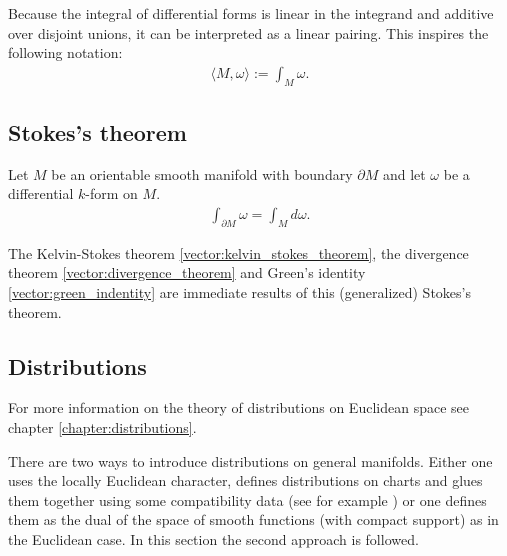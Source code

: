 
    \begin{notation}
        Because the integral of differential forms is linear in the integrand and additive over disjoint unions, it can be interpreted as a linear pairing. This inspires the following notation:
        \begin{gather}
            \langle M,\omega \rangle := \int_M\omega.
        \end{gather}
    \end{notation}

\subsection{Stokes's theorem}

    \begin{theorem}\label{diff:stokes_theorem}
        Let $M$ be an orientable smooth manifold with boundary $\partial M$ and let $\omega$ be a differential $k$-form on $M$.
        \begin{gather}
            \int_{\partial M}\omega = \int_M d\omega.
        \end{gather}
    \end{theorem}
    \begin{result}
        The Kelvin-Stokes theorem \ref{vector:kelvin_stokes_theorem}, the divergence theorem \ref{vector:divergence_theorem} and Green's identity \ref{vector:green_indentity} are immediate results of this (generalized) Stokes's theorem.
    \end{result}

\subsection{Distributions}

    For more information on the theory of distributions on Euclidean space see chapter \ref{chapter:distributions}.

    There are two ways to introduce distributions on general manifolds. Either one uses the locally Euclidean character, defines distributions on charts and glues them together using some compatibility data (see for example \cite{AMP1}) or one defines them as the dual of the space of smooth functions (with compact support) as in the Euclidean case. In this section the second approach is followed.

